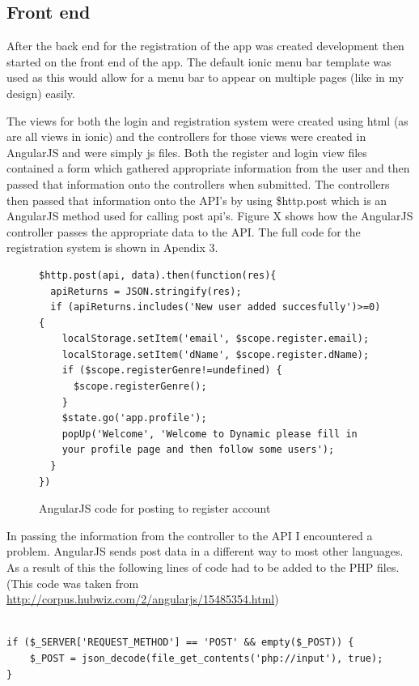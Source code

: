 \subsection{Front end}
After the back end for the registration of the app was created development then started on the front end of the app. The default ionic menu bar template was used as this would allow for a menu bar to appear on multiple pages (like in my design) easily.

The views for both the login and registration system were created using html (as are all views in ionic) and the controllers for those views were created in AngularJS and were simply js files. Both the register and login view files contained a form which gathered appropriate information from the user and then passed that information onto the controllers when submitted. The controllers then passed that information onto the API's by using \$http.post which is an AngularJS method used for calling post api's. Figure X shows how the AngularJS controller passes the appropriate data to the API. The full code for the registration system is shown in Apendix 3.
\begin{figure}
\begin{verbatim}
$http.post(api, data).then(function(res){
  apiReturns = JSON.stringify(res);
  if (apiReturns.includes('New user added succesfully')>=0) {
    localStorage.setItem('email', $scope.register.email);
    localStorage.setItem('dName', $scope.register.dName);
    if ($scope.registerGenre!=undefined) {
      $scope.registerGenre();
    }
    $state.go('app.profile');
    popUp('Welcome', 'Welcome to Dynamic please fill in 
    your profile page and then follow some users');
  }
})
\end{verbatim}
\caption{AngularJS code for posting to register account}
\end{figure}

In passing the information from the controller to the API I encountered a problem. AngularJS sends post data in a different way to most other languages. As a result of this the following lines of code had to be added to the PHP files. (This code was taken from \url{http://corpus.hubwiz.com/2/angularjs/15485354.html})
\begin{verbatim}

if ($_SERVER['REQUEST_METHOD'] == 'POST' && empty($_POST)) {
    $_POST = json_decode(file_get_contents('php://input'), true);
}

\end{verbatim}

